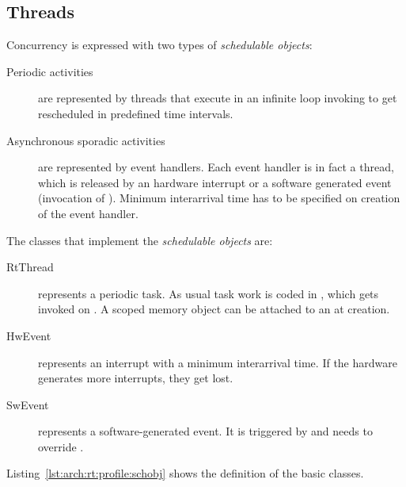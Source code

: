 \subsection{Threads}

Concurrency is expressed with two types of \emph{schedulable
objects}:
\begin{description}
    \item[Periodic activities] are represented by threads that execute
in an infinite loop invoking  to get
rescheduled in predefined time intervals.

    \item[Asynchronous sporadic activities] are represented by event
handlers. Each event handler is in fact a thread, which is released
by an hardware interrupt or a software generated event (invocation
of ). Minimum interarrival time has to be specified on
creation of the event handler.

\end{description}
%
The classes that implement the \emph{schedulable objects} are:
%
\begin{description}
    \item[RtThread] represents a periodic task. As usual task
work is coded in , which gets invoked on
. A scoped memory object can be attached to an
 at creation.

    \item[HwEvent] represents an interrupt with a minimum
interarrival time. If the hardware generates more interrupts, they
get lost.

    \item[SwEvent] represents a software-generated event.
It is triggered by  and needs to override
.

\end{description}
%
Listing~\ref{lst:arch:rt:profile:schobj} shows the definition of the
basic classes.

